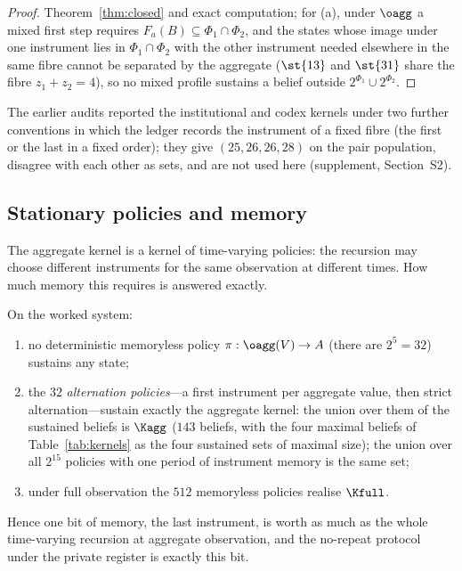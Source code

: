 \begin{proof}
Theorem~\ref{thm:closed} and exact computation; for (a), under $\oagg$ a mixed first step requires $F_a(B)\subseteq\Phi_1\cap\Phi_2$, and the states whose image under one instrument lies in $\Phi_1\cap\Phi_2$ with the other instrument needed elsewhere in the same fibre cannot be separated by the aggregate ($\st{13}$ and $\st{31}$ share the fibre $z_1+z_2=4$), so no mixed profile sustains a belief outside $2^{\Phi_1}\cup2^{\Phi_2}$.
\end{proof}

The earlier audits reported the institutional and codex kernels under two further conventions in which the ledger records the instrument of a fixed fibre (the first or the last in a fixed order); they give $(25,26,26,28)$ on the pair population, disagree with each other as sets, and are not used here (supplement, Section~S2).

\subsection{Stationary policies and memory}\label{sec:stationary}

The aggregate kernel is a kernel of time-varying policies: the recursion may choose different instruments for the same observation at different times. How much memory this requires is answered exactly.

\begin{proposition}\label{prop:stationary}
On the worked system:
\begin{enumerate}[label=(\alph*),leftmargin=2em,itemsep=1pt]
\item no deterministic memoryless policy $\pi:\oagg(V)\to A$ (there are $2^5=32$) sustains any state;
\item the $32$ \emph{alternation policies}---a first instrument per aggregate value, then strict alternation---sustain exactly the aggregate kernel: the union over them of the sustained beliefs is $\Kagg$ ($143$ beliefs, with the four maximal beliefs of Table~\ref{tab:kernels} as the four sustained sets of maximal size); the union over all $2^{15}$ policies with one period of instrument memory is the same set;
\item under full observation the $512$ memoryless policies realise $\Kfull$.
\end{enumerate}
Hence one bit of memory, the last instrument, is worth as much as the whole time-varying recursion at aggregate observation, and the no-repeat protocol under the private register is exactly this bit.
\end{proposition}

